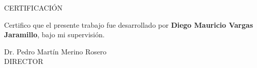 \pagestyle{empty}
\vspace*{30mm}
\begin{center}
CERTIFICACIÓN
\end{center}
\vspace{20mm}
Certifico que el presente trabajo fue desarrollado por \textbf{Diego Mauricio Vargas Jaramillo}, bajo mi supervisión.\vspace{40mm}


\begin{center}
	
	Dr. Pedro Martín Merino Rosero\\
	DIRECTOR
	
	

\end{center}
